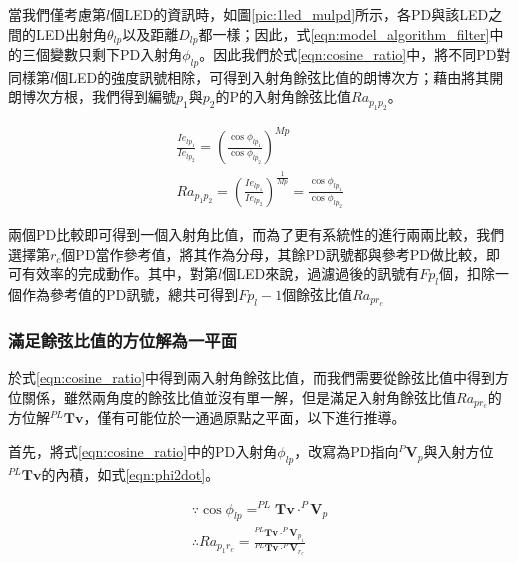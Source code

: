         當我們僅考慮第$l$個LED的資訊時，如圖\ref{pic:1led_mulpd}所示，各PD與該LED之間的LED出射角$\theta_{lp}$以及距離$D_{lp}$都一樣；因此，式\ref{eqn:model_algorithm_filter}中的三個變數只剩下PD入射角$\phi_{lp}$。因此我們於式\ref{eqn:cosine_ratio}中，將不同PD對同樣第$l$個LED的強度訊號相除，可得到入射角餘弦比值的朗博次方；藉由將其開朗博次方根，我們得到編號$p_1$與$p_2$的P的入射角餘弦比值$Ra_{p_1p_2}$。
    
        \begin{equation}
            \label{eqn:cosine_ratio}
            \begin{aligned}
                \frac{Ie_{lp_1}}{Ie_{lp_2}}={(\frac{\cos\phi_{lp_1}} {\cos\phi_{lp_2}})}^{Mp}\\
                Ra_{p_1p_2} = {( \frac{Ie_{lp_1}}{Ie_{lp_2}})} ^{\frac{1}{Mp}} = \frac{\cos\phi_{lp_1}}{\cos\phi_{lp_2}}
            \end{aligned}
        \end{equation}

        兩個PD比較即可得到一個入射角比值，而為了更有系統性的進行兩兩比較，我們選擇第$r_c$個PD當作參考值，將其作為分母，其餘PD訊號都與參考PD做比較，即可有效率的完成動作。其中，對第$l$個LED來說，過濾過後的訊號有$Fp_l$個，扣除一個作為參考值的PD訊號，總共可得到$Fp_l-1$個餘弦比值$Ra_{pr_c}$

    \subsubsection{滿足餘弦比值的方位解為一平面}
    \label{chp:solve_surface}
        
        於式\ref{eqn:cosine_ratio}中得到兩入射角餘弦比值，而我們需要從餘弦比值中得到方位關係，雖然兩角度的餘弦比值並沒有單一解，但是滿足入射角餘弦比值$Ra_{pr_c}$的方位解$^{PL}\boldsymbol{Tv}$，僅有可能位於一通過原點之平面，以下進行推導。
        
        首先，將式\ref{eqn:cosine_ratio}中的PD入射角$\phi_{lp}$，改寫為PD指向$^P\boldsymbol{V}_p$與入射方位$^{PL}\boldsymbol{Tv}$的內積，如式\ref{eqn:phi2dot}。
     

        \begin{equation}
            \label{eqn:phi2dot}
            \begin{aligned}
                \because \cos\phi_{lp} = ^{PL}\boldsymbol{Tv}\cdot^P\boldsymbol{V}_p\\
                \therefore Ra_{p_1r_c}
                =\frac{^{PL}\boldsymbol{Tv}\cdot^P\boldsymbol{V}_{p_1}}{^{PL}\boldsymbol{Tv}\cdot^P\boldsymbol{V}_{r_c}}
            \end{aligned}
        \end{equation}

